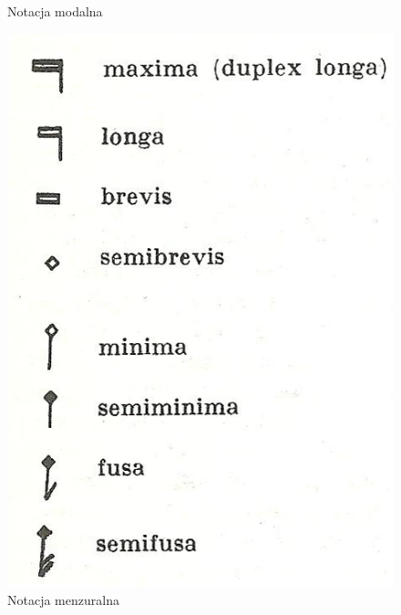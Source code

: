 \documentclass[polish,thesis,12pt]{dcsbook}
\begin{document}
\begin{figure}[H]
\begin{minipage}[t]{0.45\textwidth}
    \caption{Notacja modalna~\cite{Reiss}}
    \label{notacja_modalna}
  \end{minipage}
  \begin{minipage}[t]{0.45\textwidth}
    \includegraphics[scale=1.9,bb=0 0 110 158]{img/notacja menzuralna.png}
    \caption{Notacja menzuralna~\cite{Encyklopedia}}
    \label{notacja_menzuralna}
  \end{minipage}
  \begin{minipage}[t]{0.45\textwidth}

\end{minipage}
\end{figure}
\end{document}
